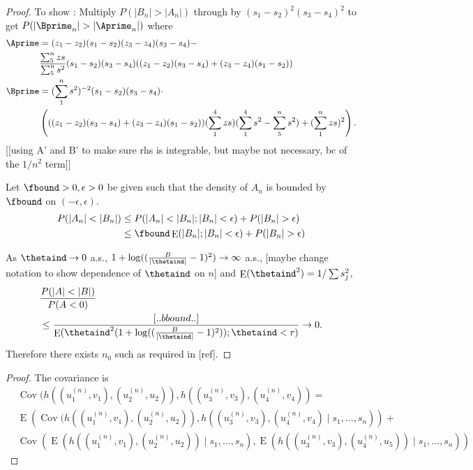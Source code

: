 \documentclass[12pt]{article}
\renewcommand{\P}{P}
\newcommand{\bnd}{B}
\newcommand{\A}{A}
\newcommand{\B}{B}
\DeclareMathOperator{\E}{E}
\DeclareMathOperator{\Cov}{Cov}
\begin{document}
{\begin{proof}
      To show : Multiply $P(|\B_n|>|\A_n|)$ through by $(s_1-s_2)^2(s_3-s_4)^2$ to get $P(|\Bprime_n|>|\Aprime_n|)$ where
      \begin{align}
        \Aprime&=(z_1-z_2)(s_1-s_2)(z_3-z_4)(s_3-s_4) - \\
               &\frac{\sum_5^n zs}{\sum_5^n s^2}(s_1-s_2)(s_3-s_4)((z_1-z_2)(s_3-s_4)+(z_3-z_4)(s_1-s_2))\\
        \Bprime&= (\sum_1^n s^2)^{-2}(s_1-s_2)(s_3-s_4)\cdot\\
               &\left(((z_1-z_2)(s_3-s_4)+(z_3-z_4)(s_1-s_2))(\sum_1^4 zs)(\sum_1^4 s^2 - \sum_5^n s^2) + (\sum_1^n zs)^2\right).
      \end{align}
      [[using A' and B' to make sure rhs is integrable, but maybe not necessary, bc of the $1/n^2$ term]]

      Let $\fbound >0,\epsilon>0$ be given such that the density of $\A_n$ is bounded by $\fbound$ on $(-\epsilon,\epsilon)$.
      \begin{align}
        \P(|\A_n|<|\B_n|) &\le \P(|\A_n|<|\B_n|; |\B_n|<\epsilon) + \P(|\B_n|>\epsilon)\\
        &\le \fbound\E(|\B_n|; |\B_n|<\epsilon) + \P(|\B_n|>\epsilon)\\
      \end{align}
      
      As $\thetaind\to 0$ a.s., $1+\log((\frac{\bnd}{|\thetaind|}-1)^2)\to\infty$ a.s., [maybe change notation to show dependence of $\thetaind$ on $n$] and $\E(\thetaind^2)=1/\sum s_j^2$,
      \begin{align}
        &\frac{\P(|\A|<|\B|)}{\P(\A<0)}\\
        &\le \frac{\mbox[..b bound..]}{\E(\thetaind^2(1+\log((\frac{\bnd}{|\thetaind|}-1)^2)); \thetaind<r)} \to 0.
      \end{align}
      Therefore there exists $n_0$ such as required in [ref].
    \end{proof}



    
    \begin{proof}
      The covariance is
      \begin{align}
        &\Cov(h((u_1^{(n)},v_1),(u_2^{(n)},u_2)),h((u^{(n)}_3,v_3),(u^{(n)}_4,v_4)) = \\
        &\E\left(\Cov(h((u_1^{(n)},v_1),(u_2^{(n)},u_2)),h((u^{(n)}_3,v_3),(u^{(n)}_4,v_4)\mid s_1,\ldots,s_n) \right) + \\
        &\Cov\left(\E\left(h((u_1^{(n)},v_1),(u_2^{(n)},u_2))\mid s_1,\ldots,s_n\right), \E\left(h((u_3^{(n)},v_3),(u_4^{(n)},u_5))\mid s_1,\ldots,s_n\right)\right)
      \end{align}


\end{proof}}
\end{document}
